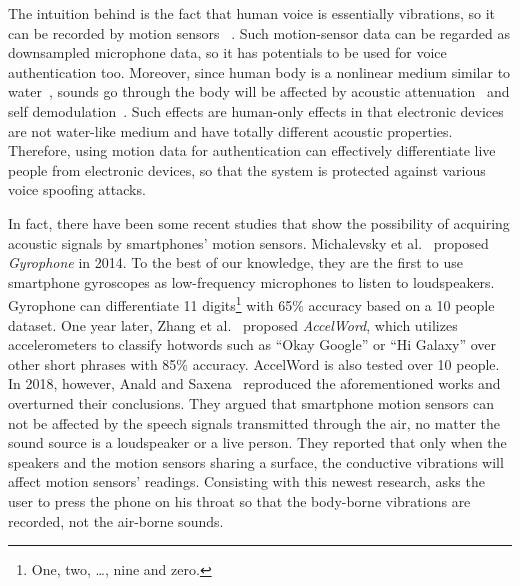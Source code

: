 The intuition behind {\shortname} is the fact that human voice is essentially vibrations, so it can be recorded by motion sensors ~\cite{hopkin2003getting,o2009sonic,michalevsky2014gyrophone}.  Such motion-sensor data can be regarded as downsampled microphone data, so it has potentials to be used for voice authentication too. 
%
Moreover, since human body is a nonlinear medium similar to water~\cite{kim2014sound}, sounds go through the body will be affected by acoustic attenuation~\cite{szabo1994time} and self demodulation~\cite{berktay1965possible}. Such effects are human-only effects in that electronic devices are not water-like medium and have totally different acoustic properties. Therefore, using motion data for authentication can effectively differentiate live people from electronic devices, so that the system is protected against various voice spoofing attacks.

In fact,  there have been some recent studies that show the possibility of acquiring acoustic signals by smartphones' motion sensors. Michalevsky et al.~\cite{michalevsky2014gyrophone} proposed \textit{Gyrophone} in 2014. To the best of our knowledge, they are the first to use smartphone gyroscopes as low-frequency microphones to listen to loudspeakers. Gyrophone can differentiate 11 digits\footnote{One, two, \ldots, nine and zero.} with 65\% accuracy based on a 10 people dataset.
%
One year later, Zhang et al.~\cite{zhang2015accelword} proposed \textit{AccelWord}, which utilizes accelerometers to classify hotwords such as ``Okay Google'' or ``Hi Galaxy'' over other short phrases with 85\% accuracy. AccelWord is also tested over 10 people.
%
In 2018, however, Anald and Saxena~\cite{anand2018speechless} reproduced the aforementioned works and overturned their conclusions. They argued that smartphone motion sensors can not be affected by the speech signals transmitted through the air, no matter the sound source is a loudspeaker or a live person. They reported that only when the speakers and the motion sensors sharing a surface,  the  conductive vibrations will affect motion sensors' readings. Consisting with this newest research, {\shortname} asks the user to press the phone on his throat so that the body-borne vibrations are recorded, not the air-borne sounds.



